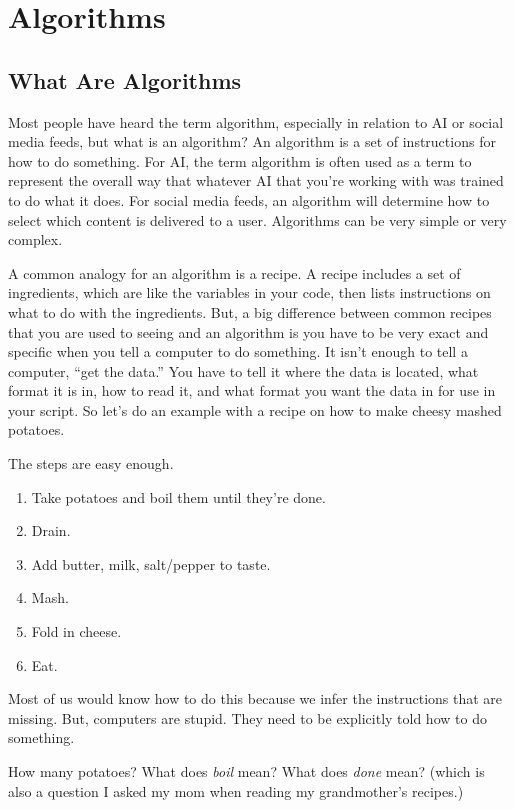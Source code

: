 \documentclass[
]{book}
\providecommand{\tightlist}{%
  \setlength{\itemsep}{0pt}\setlength{\parskip}{0pt}}
\begin{document}
\chapter{Algorithms}\label{algorithms}

\section{What Are Algorithms}\label{what-are-algorithms}

Most people have heard the term algorithm, especially in relation to AI or social media feeds, but what is an algorithm? An algorithm is a set of instructions for how to do something. For AI, the term algorithm is often used as a term to represent the overall way that whatever AI that you're working with was trained to do what it does. For social media feeds, an algorithm will determine how to select which content is delivered to a user. Algorithms can be very simple or very complex.

A common analogy for an algorithm is a recipe. A recipe includes a set of ingredients, which are like the variables in your code, then lists instructions on what to do with the ingredients. But, a big difference between common recipes that you are used to seeing and an algorithm is you have to be very exact and specific when you tell a computer to do something. It isn't enough to tell a computer, ``get the data.'' You have to tell it where the data is located, what format it is in, how to read it, and what format you want the data in for use in your script. So let's do an example with a recipe on how to make cheesy mashed potatoes.

The steps are easy enough.

\begin{enumerate}
\def\labelenumi{\arabic{enumi}.}
\tightlist
\item
  Take potatoes and boil them until they're done.
\item
  Drain.
\item
  Add butter, milk, salt/pepper to taste.
\item
  Mash.
\item
  Fold in cheese.
\item
  Eat.
\end{enumerate}

Most of us would know how to do this because we infer the instructions that are missing. But, computers are stupid. They need to be explicitly told how to do something.

How many potatoes? What does \emph{boil} mean? What does \emph{done} mean? (which is also a question I asked my mom when reading my grandmother's recipes.)
\end{document}
